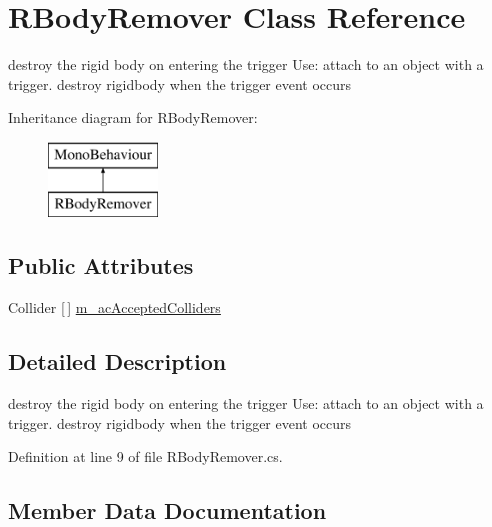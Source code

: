 \hypertarget{class_r_body_remover}{}\section{R\+Body\+Remover Class Reference}
\label{class_r_body_remover}


destroy the rigid body on entering the trigger Use\+: attach to an object with a trigger. destroy rigidbody when the trigger event occurs  


Inheritance diagram for R\+Body\+Remover\+:\begin{figure}[H]
\begin{center}
\leavevmode
\includegraphics[height=2.000000cm]{class_r_body_remover}
\end{center}
\end{figure}
\subsection*{Public Attributes}
\begin{DoxyCompactItemize}
\item 
Collider \mbox{[}$\,$\mbox{]} \mbox{\hyperlink{class_r_body_remover_ae11e7f7d7ea8a0d3b2f626f425eabc02}{m\+\_\+ac\+Accepted\+Colliders}}
\end{DoxyCompactItemize}


\subsection{Detailed Description}
destroy the rigid body on entering the trigger Use\+: attach to an object with a trigger. destroy rigidbody when the trigger event occurs 



Definition at line 9 of file R\+Body\+Remover.\+cs.



\subsection{Member Data Documentation}
\mbox{\label{class_r_body_remover_ae11e7f7d7ea8a0d3b2f626f425eabc02}} 
